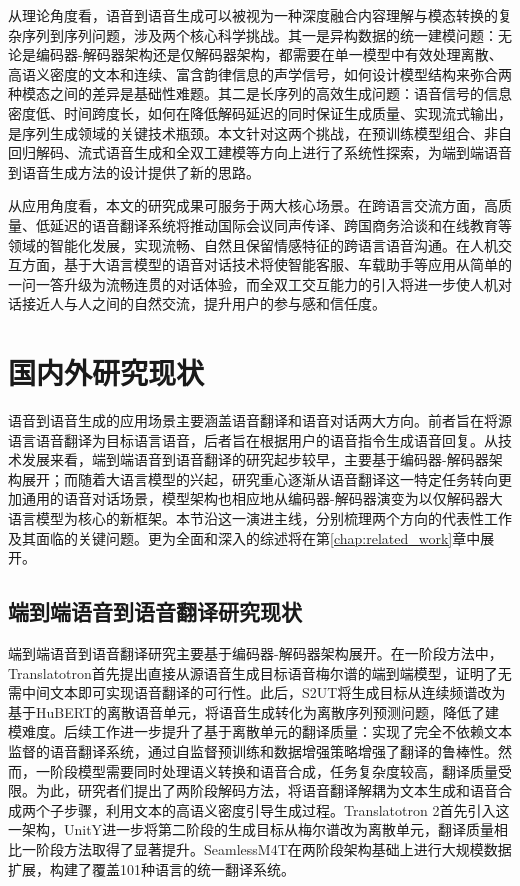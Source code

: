 从理论角度看，语音到语音生成可以被视为一种深度融合内容理解与模态转换的复杂序列到序列问题，涉及两个核心科学挑战。其一是异构数据的统一建模问题：无论是编码器-解码器架构还是仅解码器架构，都需要在单一模型中有效处理离散、高语义密度的文本和连续、富含韵律信息的声学信号，如何设计模型结构来弥合两种模态之间的差异是基础性难题。其二是长序列的高效生成问题：语音信号的信息密度低、时间跨度长，如何在降低解码延迟的同时保证生成质量、实现流式输出，是序列生成领域的关键技术瓶颈。本文针对这两个挑战，在预训练模型组合、非自回归解码、流式语音生成和全双工建模等方向上进行了系统性探索，为端到端语音到语音生成方法的设计提供了新的思路。

从应用角度看，本文的研究成果可服务于两大核心场景。在跨语言交流方面，高质量、低延迟的语音翻译系统将推动国际会议同声传译、跨国商务洽谈和在线教育等领域的智能化发展，实现流畅、自然且保留情感特征的跨语言语音沟通。在人机交互方面，基于大语言模型的语音对话技术将使智能客服、车载助手等应用从简单的一问一答升级为流畅连贯的对话体验，而全双工交互能力的引入将进一步使人机对话接近人与人之间的自然交流，提升用户的参与感和信任度。


\section{国内外研究现状}

语音到语音生成的应用场景主要涵盖语音翻译和语音对话两大方向。前者旨在将源语言语音翻译为目标语言语音，后者旨在根据用户的语音指令生成语音回复。从技术发展来看，端到端语音到语音翻译的研究起步较早，主要基于编码器-解码器架构展开；而随着大语言模型的兴起，研究重心逐渐从语音翻译这一特定任务转向更加通用的语音对话场景，模型架构也相应地从编码器-解码器演变为以仅解码器大语言模型为核心的新框架。本节沿这一演进主线，分别梳理两个方向的代表性工作及其面临的关键问题。更为全面和深入的综述将在第\ref{chap:related_work}章中展开。

\subsection{端到端语音到语音翻译研究现状}

端到端语音到语音翻译研究主要基于编码器-解码器架构展开。在一阶段方法中，Translatotron\citep{translatotron}首先提出直接从源语音生成目标语音梅尔谱的端到端模型，证明了无需中间文本即可实现语音翻译的可行性。此后，S2UT\citep{s2ut}将生成目标从连续频谱改为基于HuBERT的离散语音单元，将语音生成转化为离散序列预测问题，降低了建模难度。后续工作进一步提升了基于离散单元的翻译质量：\citet{lee-etal-2022-textless}实现了完全不依赖文本监督的语音翻译系统，\citet{DBLP:conf/interspeech/PopuriCWPAGHL22}通过自监督预训练和数据增强策略增强了翻译的鲁棒性。然而，一阶段模型需要同时处理语义转换和语音合成，任务复杂度较高，翻译质量受限。为此，研究者们提出了两阶段解码方法，将语音翻译解耦为文本生成和语音合成两个子步骤，利用文本的高语义密度引导生成过程。Translatotron 2\citep{translatotron2}首先引入这一架构，UnitY\citep{inaguma-etal-2023-unity}进一步将第二阶段的生成目标从梅尔谱改为离散单元，翻译质量相比一阶段方法取得了显著提升。SeamlessM4T\citep{communication2023seamlessm4t}在两阶段架构基础上进行大规模数据扩展，构建了覆盖101种语言的统一翻译系统。

